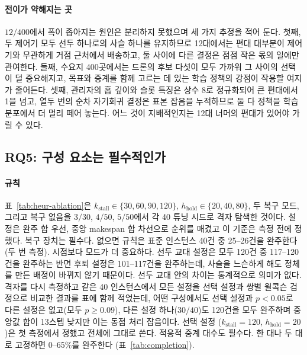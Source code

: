 \documentclass[final,5p,times,twocolumn]{elsarticle}
\begin{document}
\paragraph{전이가 약해지는 곳}
$12/400$에서 폭이 좁아지는 원인은 분리하지
못했으며 세 가지 추정을 적어 둔다. 첫째, 두 제어기 모두 선두 하나로의 사슬 하나를 유지하므로
12대에서는 편대 대부분이 제어기와 무관하게 거점 근처에서 배송하고, 둘 사이에 다른 결정은 점점 작은
몫의 일에만 관여한다. 둘째, 수요지 400곳에서는 드론의 후보 다섯이 모두 가까워 그 사이의 선택이
덜 중요해지고, 목표와 중계를 함께 고르는 데 있는 학습 정책의 강점이 작용할 여지가 줄어든다. 셋째,
관리자의 홉 깊이와 슬롯 특징은 상수 8로 정규화되어 큰 편대에서 1을 넘고, 열두 번의 순차 자기회귀
결정은 표본 잡음을 누적하므로 둘 다 정책을 학습 분포에서 더 멀리 떼어 놓는다. 어느 것이
지배적인지는 12대 너머의 편대가 있어야 가릴 수 있다.

\subsection{RQ5: 구성 요소는 필수적인가}
\label{sec:rq5}

\paragraph{규칙}
\label{sec:rq5-heuristic}
표~\ref{tab:heur-ablation}은 $k_{\mathrm{stall}} \in \{30,60,90,120\}$,
$h_{\mathrm{hold}} \in \{20,40,80\}$, 두 복구 모드, 그리고 복구 없음을 $3/30$, $4/50$, $5/50$에서
각 40 튜닝 시드로 격자 탐색한 것이다. 설정은 완주 합 우선, 중앙 makespan 합 차선으로 순위를
매겼고 이 기준은 측정 전에 정했다. 복구 장치는 필수다. 없으면 규칙은 표준 인스턴스 40건 중
25--26건을 완주한다(두 번 측정). 시점보다 모드가 더 중요하다. 선두 교대 설정은 모두 120건 중
117--120건을 완주하는 반면 후퇴 설정은 101--117건을 완주하는데, 사슬을 느슨하게 해도 정체를 만든
배정이 바뀌지 않기 때문이다. 선두 교대 안의 차이는 통계적으로 의미가 없다. 격자를 다시 측정하고
같은 40 인스턴스에서 모든 설정을 선택 설정과 쌍별 윌콕슨 검정으로 비교한 결과를 표에 함께 적었는데,
어떤 구성에서도 선택 설정과 $p<0.05$로 다른 설정은 없고(모두 $p \ge 0.09$), 다른 설정 하나($30/40$)도
120건을 모두 완주하며 중앙값 합이 13스텝 낮지만 이는 동점 처리 잡음이다. 선택 설정
($k_{\mathrm{stall}}=120$, $h_{\mathrm{hold}}=20$)은 첫 측정에서 정했고 전체에 그대로 쓴다. 적응적 중계 대수도 필수다. 한 대나 두 대로 고정하면 0--65\%를 완주한다
(표~\ref{tab:completion}).

\begin{table}[t]
\centering
\caption{평가 시드와 분리된 튜닝 시드(구성당 40 인스턴스)에서의 규칙 절제. 셀은 완주
인스턴스 수, 완주 인스턴스의 중앙 makespan, 그리고 괄호 안에 둘 다 완주한 인스턴스에서 그 설정을
선택 설정(굵게)과 비교한 윌콕슨 부호순위 검정의 $p$값이다. 마지막 열은 세 구성의 완주 합이다.}
\label{tab:heur-ablation}
\small

\end{table}
\end{document}
